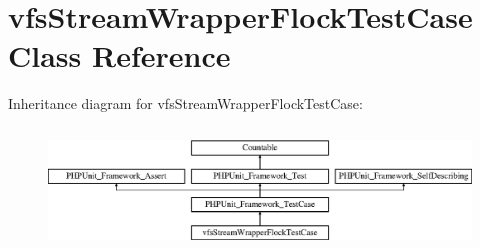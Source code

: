 \hypertarget{classorg_1_1bovigo_1_1vfs_1_1vfs_stream_wrapper_flock_test_case}{}\section{vfs\+Stream\+Wrapper\+Flock\+Test\+Case Class Reference}
\label{classorg_1_1bovigo_1_1vfs_1_1vfs_stream_wrapper_flock_test_case}
Inheritance diagram for vfs\+Stream\+Wrapper\+Flock\+Test\+Case\+:\begin{figure}[H]
\begin{center}
\leavevmode
\includegraphics[height=3.303835cm]{classorg_1_1bovigo_1_1vfs_1_1vfs_stream_wrapper_flock_test_case}
\end{center}
\end{figure}

